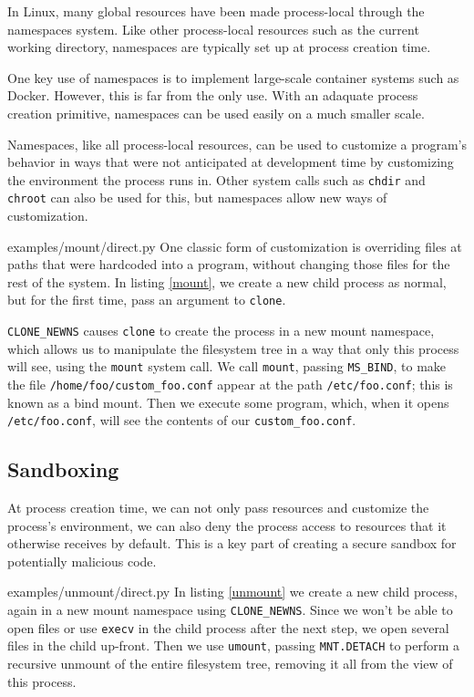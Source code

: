 \documentclass[letterpaper,twocolumn,10pt]{article}
\begin{document}
In Linux, many global resources have been made process-local
through the namespaces system.\cite{lwn_namespaces}
Like other process-local resources such as the current working directory,
namespaces are typically set up at process creation time.

One key use of namespaces is to implement large-scale container systems such as Docker.\cite{lwn_namespaces}
However, this is far from the only use.
With an adaquate process creation primitive,
namespaces can be used easily on a much smaller scale.

Namespaces, like all process-local resources,
can be used to customize a program's behavior
in ways that were not anticipated at development time
by customizing the environment the process runs in.\cite{plan9ns}
Other system calls such as \texttt{chdir} and \texttt{chroot} can also be used for this,
but namespaces allow new ways of customization.\cite{mount_namespaces}


{examples/mount/direct.py}
One classic form of customization
is overriding files at paths that were hardcoded into a program,
without changing those files for the rest of the system.
In listing \ref{mount},
we create a new child process as normal,
but for the first time,
pass an argument to \texttt{clone}.

\verb|CLONE_NEWNS| causes \texttt{clone} to create the process in a new mount namespace,
which allows us to manipulate the filesystem tree in a way that only this process will see,
using the \texttt{mount} system call.\cite{mount_namespaces}\cite{clone}
We call \texttt{mount}, passing \texttt{MS\_BIND}, to make the file \verb|/home/foo/custom_foo.conf|
appear at the path \verb|/etc/foo.conf|;
this is known as a bind mount.\cite{mount}
Then we execute some program,
which, when it opens \verb|/etc/foo.conf|, will see the contents of our \verb|custom_foo.conf|.
\subsection{Sandboxing}
At process creation time,
we can not only pass resources and customize the process's environment,
we can also deny the process access to resources that it otherwise receives by default.
This is a key part of creating a secure sandbox for potentially malicious code.\cite{seccomp}\cite{firejail}\cite{gvisor}


{examples/unmount/direct.py}
In listing \ref{unmount}
we create a new child process,
again in a new mount namespace using \verb|CLONE_NEWNS|.
Since we won't be able to open files or use \texttt{execv} in the child process after the next step,
we open several files in the child up-front.
Then we use \texttt{umount},
passing \texttt{MNT.DETACH} to perform a recursive unmount of the entire filesystem tree,
removing it all from the view of this process.
\end{document}
